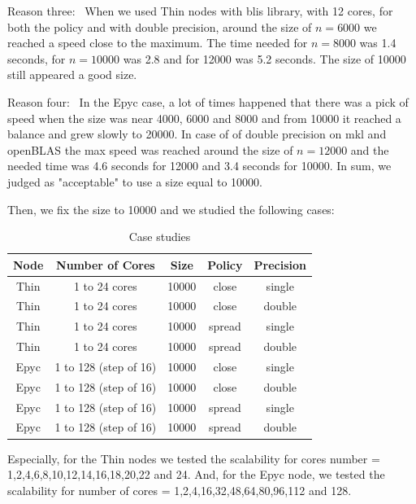 \documentclass[12pt, titlepage]{report}
\begin{document}
Reason three: \
When we used Thin nodes with blis library, with 12 cores, for both the policy and with double precision, around the size of $ n = 6000 $ we reached a speed close to the maximum. The time needed for $ n = 8000 $ was 1.4 seconds, for $ n = 10000 $ was 2.8 and for 12000 was 5.2 seconds. The size of 10000 still appeared a good size. 

Reason four: \
In the Epyc case, a lot of times happened that there was a pick of speed when the size was near 4000, 6000 and 8000 and from 10000 it reached a balance and grew slowly to 20000. In case of of double precision on mkl and openBLAS the max speed was reached around the size of $n = 12000 $ and the needed time was 4.6 seconds for 12000 and 3.4 seconds for 10000. In sum, we judged as "acceptable" to use a size equal to 10000.

Then, we fix the size to 10000 and we studied the following cases:

\begin{table}[h]
\centering
\begin{tabular}{|c|c|c|c|c|}
\hline
\textbf{Node} & \textbf{Number of Cores} & \textbf{Size} & \textbf{Policy} & \textbf{Precision} \\
\hline
Thin & 1 to 24 cores & 10000 & close & single \\
Thin & 1 to 24 cores & 10000 & close & double \\
Thin & 1 to 24 cores & 10000 & spread & single \\
Thin & 1 to 24 cores & 10000 & spread & double \\
\hline
Epyc & 1 to 128 (step of 16) & 10000 & close & single \\
Epyc & 1 to 128 (step of 16) & 10000 & close & double \\
Epyc & 1 to 128 (step of 16) & 10000 & spread & single \\
Epyc & 1 to 128 (step of 16) & 10000 & spread & double \\
\hline
\end{tabular}
\caption{Case studies}
\end{table}

Especially, for the Thin nodes we tested the scalability for cores number = 1,2,4,6,8,10,12,14,16,18,20,22 and 24. 
And, for the Epyc node, we tested the scalability for number of cores = 1,2,4,16,32,48,64,80,96,112 and 128.
\end{document}
